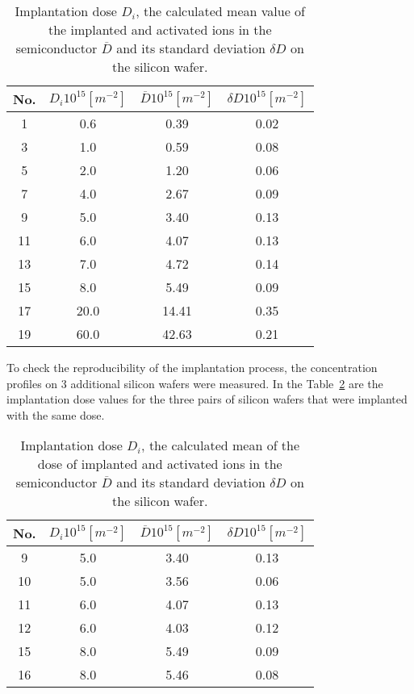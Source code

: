 \begin{table}[h!]\centering
  \begin{minipage}[c]{\myfiguresize}
    \begin{center}
      \begin{tabular}{c c c c}
        No. & ${D_{i}}{10}^{15}[m^{-2}]$ & $\overline{D}{10}^{15}[m^{-2}]$ & $\delta{D}{10}^{15}[m^{-2}]$\\
        \hline
        1 & 0.6 & 0.39 & 0.02\\
        3 & 1.0 & 0.59 & 0.08\\
        5 & 2.0 & 1.20 & 0.06\\
        7 & 4.0 & 2.67 & 0.09\\
        9 & 5.0 & 3.40 & 0.13\\
        11 & 6.0 & 4.07 & 0.13\\
        13 & 7.0 & 4.72 & 0.14\\
        15 & 8.0 & 5.49 & 0.09\\
        17 & 20.0 & 14.41 & 0.35\\
        19 & 60.0 & 42.63 & 0.21\\
      \end{tabular}
    \end{center}
    \caption[Implantation dose $D_{i}$]{Implantation dose $D_{i}$, the
      calculated mean value of the implanted and activated ions in the
      semiconductor $\overline D$ and its standard deviation $\delta
      D$ on the silicon wafer.}\label{tab:7.2}
  \end{minipage}
\end{table}

To check the reproducibility of the implantation process, the
concentration profiles on 3 additional silicon wafers were
measured. In the Table~\ref{tab:7.3} are the implantation dose values
for the three pairs of silicon wafers that were implanted with the
same dose.

\begin{table}[h!]\centering
  \begin{minipage}[c]{\myfiguresize}
    \begin{center}
      \begin{tabular}{c c c c}
        No. & $D_{i} 10^{15} [m^{-2}]$ & $\overline D 10^{15} [m^{-2}]$ & $\delta D 10^{15} [m^{-2}]$\\
        \hline
        9 & 5.0 & 3.40 & 0.13\\
        10 & 5.0 & 3.56 & 0.06\\
        11 & 6.0 & 4.07 & 0.13\\
        12 & 6.0 & 4.03 & 0.12\\
        15 & 8.0 & 5.49 & 0.09\\
        16 & 8.0 & 5.46 & 0.08\\
      \end{tabular}
    \end{center}
    \caption[Implantation dose $D_{i}$]{Implantation dose $D_{i}$, the
      calculated mean of the dose of implanted and activated ions in
      the semiconductor $\overline D$ and its standard deviation
      $\delta D$ on the silicon wafer.}\label{tab:7.3}
  \end{minipage}
\end{table}

